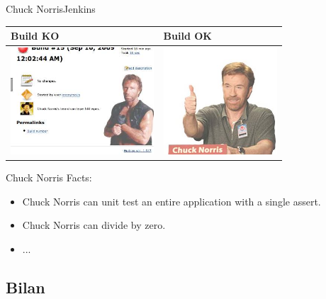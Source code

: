\documentclass[9pt]{beamer}
\newcommand{\tocsubsection}{
  \begin{frame}
    \tableofcontents[
      currentsubsection,
      sectionstyle=show/shaded,
      subsectionstyle=show/shaded,
      subsubsectionstyle=show/show/shaded
    ]
  \end{frame}
}
\begin{document}
\begin{frame}{Chuck Norris}{Jenkins}
  \begin{center}
    \begin{tabular}{ l |l }
      Build KO & Build OK \\ \hline
        \includegraphics[height=4cm]{images/chuck_full} &
      \includegraphics[height=4cm]{images/chuck_happy}
      \\
    \end{tabular}
  \end{center}
  Chuck Norris Facts:
  \begin{itemize}
    \item Chuck Norris can unit test an entire application with a single assert.
    \item Chuck Norris can divide by zero.
    \item ...
  \end{itemize}
\end{frame}




\subsection{Bilan}
\tocsubsection
\end{document}

